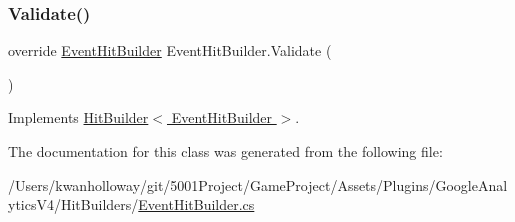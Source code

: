 \mbox{\label{class_event_hit_builder_ac25f1311eb1e5ab9910494fd143a6f8f}} 
\subsubsection{\texorpdfstring{Validate()}{Validate()}}
{\footnotesize\ttfamily override \hyperlink{class_event_hit_builder}{Event\+Hit\+Builder} Event\+Hit\+Builder.\+Validate (\begin{DoxyParamCaption}{ }\end{DoxyParamCaption})\hspace{0.3cm}{\ttfamily [virtual]}}



Implements \hyperlink{class_hit_builder_a0f4833828bd530bb057c9ca359584bce}{Hit\+Builder$<$ Event\+Hit\+Builder $>$}.



The documentation for this class was generated from the following file\+:\begin{DoxyCompactItemize}
\item 
/\+Users/kwanholloway/git/5001\+Project/\+Game\+Project/\+Assets/\+Plugins/\+Google\+Analytics\+V4/\+Hit\+Builders/\hyperlink{_event_hit_builder_8cs}{Event\+Hit\+Builder.\+cs}\end{DoxyCompactItemize}
